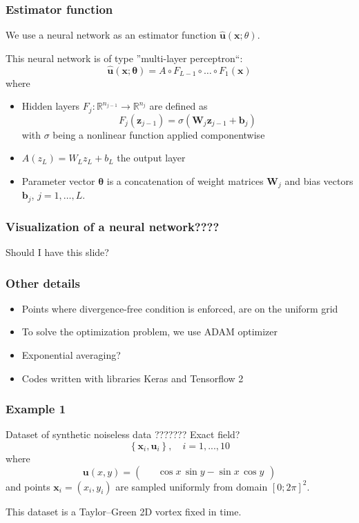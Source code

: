 \documentclass{beamer}
\def\\{}%
\renewcommand{\vec}[1]{\boldsymbol{#1}}
\newcommand{\mat}[1]{\boldsymbol{#1}}
\newcommand{\R}{\mathbb R}
\begin{document}
\begin{frame}
\frametitle{Estimator function}

We use a neural network as an estimator function $\hat{\vec u}(\vec x; \theta)$.

This neural network is of type ''multi-layer perceptron``:
\[
    \hat{\vec u}(\vec x; \vec \theta) = A \circ F_{L-1} \circ \dots \circ F_1(\vec x)
\]
where
\begin{itemize}
 \item Hidden layers $F_j : \R^{n_{j-1}} \to \R^{n_j}$ are defined as
\[
    F_j\left( \vec z_{j-1} \right) = \sigma \left( \mat W_j \vec z_{j-1} + \vec b_j \right)
\]
with $\sigma$ being a nonlinear function applied componentwise

\item $A(z_L) = W_L z_L + b_L$ the output layer

\item Parameter vector $\vec \theta$ is a concatenation of weight matrices $\mat W_j$
and bias vectors $\vec b_j$, $j=1,\dots,L$.
\end{itemize}
\end{frame}

\begin{frame}
\frametitle{Visualization of a neural network????}
Should I have this slide? 
\end{frame}

\begin{frame}
\frametitle{Other details}

\begin{itemize}
    \item Points where divergence-free condition is enforced, are on the uniform grid
    \item To solve the optimization problem, we use ADAM optimizer
    \item Exponential averaging?
    \item Codes written with libraries Keras and Tensorflow 2
\end{itemize}

\end{frame}

\begin{frame}
\frametitle{Example 1}

Dataset of synthetic noiseless data  ??????? Exact field?   
\[
    \left\{\vec{x}_i, \vec{u}_i\right\}, \quad i = 1, ..., 10
\]
where
\[
    \vec u(x, y) = \begin{pmatrix}
        \phantom{-} \cos x \, \sin y\\
        -\sin x \, \cos y
    \end{pmatrix}
\]
and points $\vec x_i = (x_i, y_i)$ are sampled uniformly from domain $[0; 2\pi]^2$.

This dataset is a Taylor--Green 2D vortex fixed in time.
\end{frame}
\end{document}
